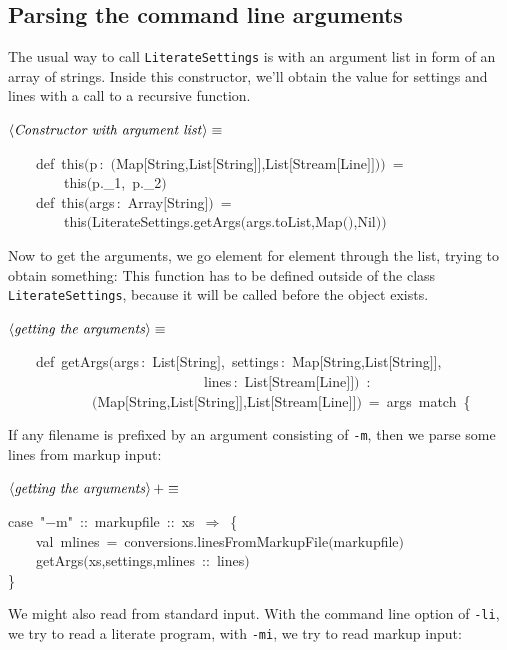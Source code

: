 \documentclass[a4paper,12pt]{article}
\begin{document}
\subsection{Parsing the command line arguments}
The usual way to call \texttt{LiterateSettings} is with an argument list in
form of an array of strings. Inside this constructor, we'll obtain the
value for settings and lines with a call to a recursive function.

$\left<\mbox{\emph{Constructor with argument list}}\right>\equiv$
\begin{program}~~~~{\vem def}~{\vem this}$($p\,{\rm :}~$($Map$[$String,List$[$String$]$$]$,List$[$Stream$[$Line$]$$]$$)$$)$~=
\\~~~~~~~~{\vem this}$($p.\_1,~p.\_2$)$
\\[0.5em]~~~~{\vem def}~{\vem this}$($args\,{\rm :}~Array$[$String$]$$)$~=
\\~~~~~~~~{\vem this}$($LiterateSettings.getArgs$($args.toList,Map$($$)$,Nil$)$$)$
\\[0.5em]\end{program}
Now to get the arguments, we go element for element through
the list, trying to obtain something: This function has to be defined
outside of the class \texttt{LiterateSettings}, because it will be called
before the object exists.

$\left<\mbox{\emph{getting the arguments}}\right>\equiv$
\begin{program}~~~~{\vem def}~getArgs$($args\,{\rm :}~List$[$String$]$,~settings\,{\rm :}~Map$[$String,List$[$String$]$$]$,
\\~~~~~~~~~~~~~~~~~~~~~~~~~~~~lines\,{\rm :}~List$[$Stream$[$Line$]$$]$$)$~{\rm :}
\\~~~~~~~~~~~~$($Map$[$String,List$[$String$]$$]$,List$[$Stream$[$Line$]$$]$$)$~=~args~{\vem match}~{\small\{}
\\[0.5em]\end{program}
If any filename is prefixed by an argument consisting of \texttt{-m},
then we parse some lines from markup input:

$\left<\mbox{\emph{getting the arguments}}\right>+\equiv$
\begin{program}{\vem case}~"$-$m"~{\rm :}{\rm :}~markupfile~{\rm :}{\rm :}~xs~$\Rightarrow$~{\small\{}
\\~~~~{\vem val}~mlines~=~conversions.linesFromMarkupFile$($markupfile$)$
\\~~~~getArgs$($xs,settings,mlines~{\rm :}{\rm :}~lines$)$
\\{\small\}}
\\[0.5em]\end{program}
We might also read from standard input. With the command line option
of \texttt{-li}, we try to read a literate program, with \texttt{-mi}, we try
to read markup input:
\end{document}
